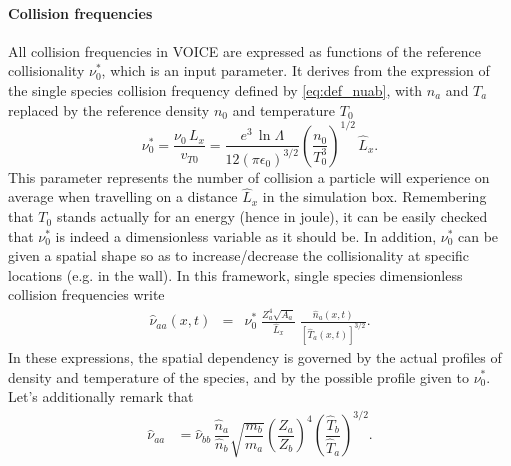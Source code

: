 \documentclass[11pt]{article}
\begin{document}
\paragraph{Collision frequencies}
\label{par:collision_frequencies}
All collision frequencies in VOICE are expressed as functions of the reference collisionality $\nu^*_0$, which is an input parameter. It derives from the expression of the single species collision frequency defined by \cref{eq:def_nuab}, with $n_a$ and $T_a$ replaced by the reference density $n_0$ and temperature $T_0$
%
\begin{equation}
	\nu^*_0 
	= \frac{\nu_{0}\, L_x}{v_{T0}} 
	= \frac{e^3\, \ln\Lambda}{12(\pi\epsilon_0)^{3/2}} 
	\left(\frac{n_0}{T_0^3}\right)^{1/2}\, \hat L_x.
\end{equation}
%
This parameter represents the number of collision a particle will experience on average when travelling on a distance $\hat{L}_x$ in the simulation box. Remembering that $T_0$ stands actually for an energy (hence in joule), it can be easily checked that $\nu^*_0$ is indeed a dimensionless variable as it should be. In addition, $\nu^*_0$ can be given a spatial shape so as to increase/decrease the collisionality at specific locations (e.g. in the wall). In this framework, single species dimensionless collision frequencies write
%
\begin{eqnarray}
	\hat\nu_{aa}(x,t) 
	&=& \nu^*_0\; \frac{Z_a^4 \sqrt{A_a}}{\hat L_x}\; \frac{\hat n_a(x,t)}{[\hat T_a(x,t)]^{3/2}}.
\end{eqnarray}
%
In these expressions, the spatial dependency is governed by the actual profiles of density and temperature of the species, and by the possible profile given to $\nu^*_0$. Let's additionally remark that 
%
\begin{align}
  \hat{\nu}_{aa} & = \hat{\nu}_{b b} \, \dfrac{\hat{n}_a}{\hat{n}_b} \sqrt{\dfrac{m_b}{m_a}} \left( \dfrac{Z_a}{Z_b} \right) ^{4} \left( \dfrac{\hat{T}_b}{\hat{T}_a} \right) ^{3/2}.
\end{align}
%
\end{document}
